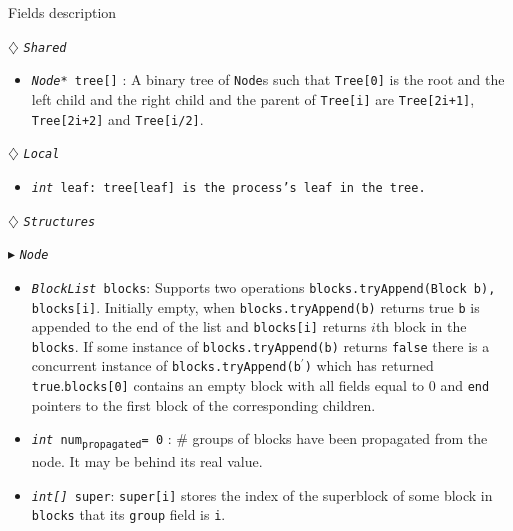 \documentclass[10pt]{article}
\newcommand{\sub}[1]{\textsubscript{#1}}
\renewcommand{\tt}[1]{\texttt{#1}}
\renewcommand{\sl}[1]{\textsl{#1}}
\renewcommand{\bf}[1]{\textbf{#1}}
\theoremstyle{definition}
\begin{document}
\begin{algorithm}
\caption{Fields description}
\begin{algorithmic}[1]
\setcounter{ALG@line}{100}
\begin{multicols}{2}


\Statex $\diamondsuit$ \tt{\sl{Shared}}
\begin{itemize}
\item \tt{\sl{Node*} tree[]} \textsf{: A binary tree of \tt{Node}s such that \tt{Tree[0]} is the root and the left child and the right child and the parent of \tt{Tree[i]} are \tt{Tree[2i+1]}, \tt{Tree[2i+2]} and \tt{Tree[i/2]}.}
\end{itemize}

\Statex

\Statex $\diamondsuit$ \tt{\sl{Local}}
\begin{itemize}
\item \tt{\sl{int} leaf\textsf{: \tt{tree[leaf]} is the process's leaf in the tree.}}
\end{itemize}

\Statex
\Statex $\diamondsuit$ \tt{\sl{Structures}}

\Statex $\blacktriangleright$ \tt{\sl{Node}}
\begin{itemize}
\item \tt{\sl{BlockList} blocks}\textsf{: Supports two operations \tt{blocks.tryAppend(Block b), blocks[i]}. Initially  empty, when \tt{blocks.tryAppend(b)} returns true \tt{b} is appended to the end of the list and \tt{blocks[i]} returns $i$th block in the \tt{blocks}. If some instance of \tt{blocks.tryAppend(b)} returns \tt{false} there is a concurrent instance of \tt{blocks.tryAppend(b$^\prime$)} which has returned \tt{true}.\tt{blocks[0]} contains an empty block with all fields equal to 0 and \tt{end} pointers to the first block of the corresponding children.}

\item \tt{\sl{int} num\sub{propagated}= 0}\textsf{} \textsf{: \# groups of blocks have been propagated from the node. It may be behind its real value.}
\item \tt{\sl{int[]} super}\textsf{: \tt{super[i]} stores the index of the superblock of some block in \tt{blocks} that its \tt{group} field is \tt{i}.}
\end{itemize}


\end{multicols}
\end{algorithmic}
\end{algorithm}
\end{document}
